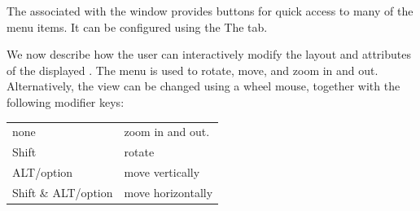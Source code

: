 \documentclass[11pt]{article}
\begin{document}
The  associated with the window provides buttons for quick access to
many of the menu items. It can be configured using the
The  tab.



We now describe how the user can interactively modify the layout and
attributes of the displayed .
The  menu
is used to rotate, move, and zoom in and out. Alternatively,
the view can be changed
using a wheel mouse, together with the following modifier keys:

\begin{center}
 \begin{tabular}{l|l}
 \hline
 none &   zoom in and out.\\
 Shift & rotate \\
 ALT/option & move vertically \\
 Shift \& ALT/option  & move horizontally \\
\hline
\end{tabular}
\end{center}
\end{document}
